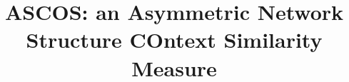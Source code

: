 \documentclass[conference]{IEEEtran}
\begin{document}
%

\title{ASCOS: an Asymmetric Network Structure COntext Similarity Measure}
%
%
%
%
%
\end{document}
